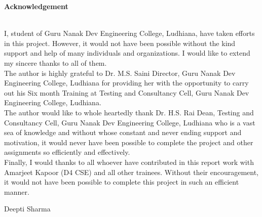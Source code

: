 \begin{center}
{\Huge \bf{Acknowledgement}\vskip 0.2in}
\end{center}
 \hrulefill \\

I, student of Guru Nanak Dev Engineering College, Ludhiana, have taken efforts in this project.
However, it would not have been possible without the kind support and help of many individuals
and organizations. I would like to extend my sincere thanks to all of them.\\

The author is highly grateful to Dr. M.S. Saini Director, Guru Nanak Dev Engineering College, Ludhiana for providing her with the opportunity to carry out his Six month Training at
Testing and Consultancy Cell, Guru Nanak Dev Engineering College, Ludhiana.\\

The author would like to whole heartedly thank Dr. H.S. Rai Dean, Testing and Consultancy
Cell, Guru Nanak Dev Engineering College, Ludhiana who is a vast sea of knowledge and without whose constant and never ending support and motivation, it would never have been possible to complete the project and other assignments so efficiently and effectively.\\

Finally, I would thanks to all whoever have contributed in this report work with Amarjeet Kapoor (D4 CSE)
and all other trainees. Without their encouragement, it would not have been possible
to complete this project in such an efficient manner.

\vskip 1.0cm 
\noindent Deepti Sharma



